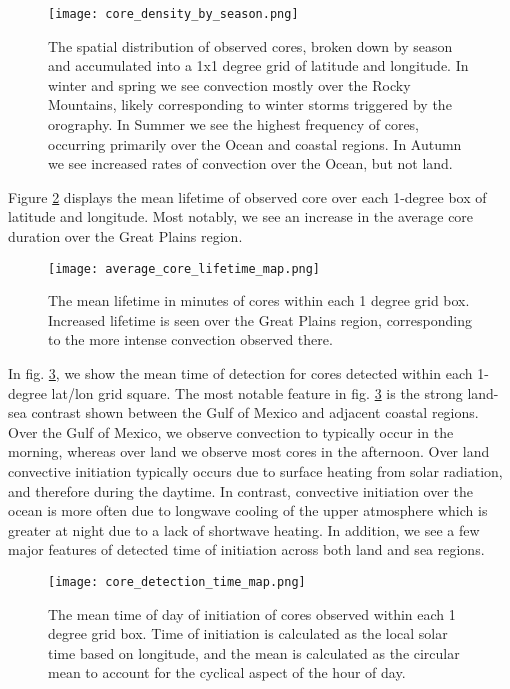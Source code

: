 \begin{figure}[h]
    \centering
    \texttt{[image: core\_density\_by\_season.png]}
    \caption{The spatial distribution of observed cores, broken down by season and accumulated into a 1x1 degree grid of latitude and longitude. In winter and spring we see convection mostly over the Rocky Mountains, likely corresponding to winter storms triggered by the orography. In Summer we see the highest frequency of cores, occurring primarily over the Ocean and coastal regions. In Autumn we see increased rates of convection over the Ocean, but not land. }
    \label{fig:spatial_density_by_season}
\end{figure}

Figure \ref{fig:core_lifetime_map} displays the mean lifetime of observed core over each 1-degree box of latitude and longitude.
Most notably, we see an increase in the average core duration over the Great Plains region.

\begin{figure}[h]
    \centering
    \texttt{[image: average\_core\_lifetime\_map.png]}
    \caption{The mean lifetime in minutes of cores within each 1 degree grid box. Increased lifetime is seen over the Great Plains region, corresponding to the more intense convection observed there.}
    \label{fig:core_lifetime_map}
\end{figure}

In fig. \ref{fig:core_tod_map}, we show the mean time of detection for cores detected within each 1-degree lat/lon grid square.
The most notable feature in fig. \ref{fig:core_tod_map} is the strong land-sea contrast shown between the Gulf of Mexico and adjacent coastal regions.
Over the Gulf of Mexico, we observe convection to typically occur in the morning, whereas over land we observe most cores in the afternoon.
Over land convective initiation typically occurs due to surface heating from solar radiation, and therefore during the daytime.
In contrast, convective initiation over the ocean is more often due to longwave cooling of the upper atmosphere which is greater at night due to a lack of shortwave heating.
In addition, we see a few major features of detected time of initiation across both land and sea regions.

\begin{figure}[t]
    \centering
    \texttt{[image: core\_detection\_time\_map.png]}
    \caption{The mean time of day of initiation of cores observed within each 1 degree grid box. Time of initiation is calculated as the local solar time based on longitude, and the mean is calculated as the circular mean to account for the cyclical aspect of the hour of day.}
    \label{fig:core_tod_map}
\end{figure}

